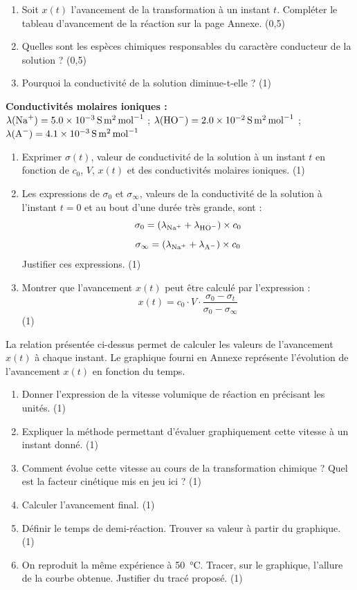 \documentclass[a4paper,12pt,fleqn]{article}%
\begin{document}
\begin{enumerate}[resume]
    \item Soit $x(t)$ l'avancement de la transformation à un instant $t$. Compléter le tableau d'avancement de la réaction sur la page Annexe. (0,5)
    \item Quelles sont les espèces chimiques responsables du caractère conducteur de la solution ? (0,5)
    \item Pourquoi la conductivité de la solution diminue-t-elle ? (1)
\end{enumerate}
\textbf{Conductivités molaires ioniques :}\\
$\lambda (\ce{Na+}) = \SI{5,0E-3}{\siemens\meter\squared\per\mole}$ ; $\lambda (\ce{HO-}) = \SI{2,0E-2}{\siemens\meter\squared\per\mole}$ ; $\lambda (\ce{A-}) = \SI{4,1E-3}{\siemens\meter\squared\per\mole}$
\begin{enumerate}[resume]
    \item Exprimer $\sigma(t)$, valeur de conductivité de la solution à un instant $t$ en fonction de $c_0$, $V$, $x(t)$ et des conductivités molaires ioniques. (1)
    \item Les expressions de $\sigma_0$ et $\sigma_{\infty}$, valeurs de la conductivité de la solution à l'instant $t=0$ et au bout d'une durée très grande, sont : $$\sigma_0 = (\lambda_{\ce{Na+}} + \lambda_{\ce{HO-}}) \times c_0$$
    $$\sigma_{\infty} = (\lambda_{\ce{Na+}} + \lambda_{\ce{A-}}) \times c_0$$
    Justifier ces expressions. (1)
    \item Montrer que l'avancement $x(t)$ peut être calculé par l'expression : $$ x(t) = c_0 \cdot V \cdot \dfrac{\sigma_0 - \sigma_t}{\sigma_0 - \sigma_{\infty}}$$ (1)
\end{enumerate}

La relation présentée ci-dessus permet de calculer les valeurs de l'avancement $x(t)$ à chaque instant. Le graphique fourni en Annexe représente l'évolution de l'avancement $x(t)$ en fonction du temps.
\begin{enumerate}[resume]
    \item Donner l'expression de la vitesse volumique de réaction en précisant les unités. (1)
    \item Expliquer la méthode permettant d'évaluer graphiquement cette vitesse à un instant donné. (1)
    \item Comment évolue cette vitesse au cours de la transformation chimique ? Quel est la facteur cinétique mis en jeu ici ? (1)
    \item Calculer l'avancement final. (1)
    \item Définir le temps de demi-réaction. Trouver sa valeur à partir du graphique. (1)
    \item On reproduit la même expérience à \SI{50}{\celsius}. Tracer, sur le graphique, l'allure de la courbe obtenue. Justifier du tracé proposé. (1)
\end{enumerate}
\end{document}
